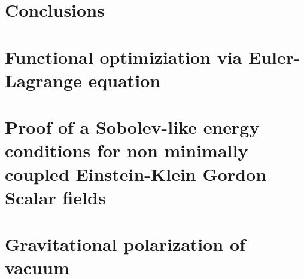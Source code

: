 \documentclass[12pt, a4paper]{book}
\begin{document}
\chapter{Conclusions}


\appendix

\chapter[Euler-Lagrange optimization]{Functional optimiziation via Euler-Lagrange equation}
\label{app:V-E-L-optimization}


\chapter[Proof of energy condition for EKG fields]{Proof of a Sobolev-like energy conditions for non minimally coupled Einstein-Klein Gordon Scalar fields}
\label{app:proof-EKG-bound}


\chapter{Gravitational polarization of vacuum}
\label{app:visser}


\printbibliography[heading=bibintoc]
\end{document}
